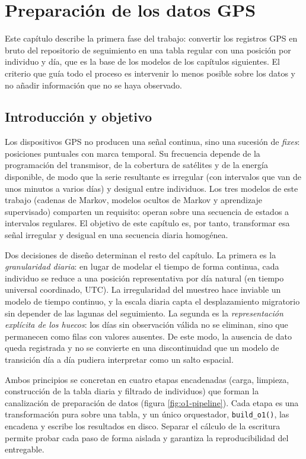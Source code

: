 \chapter{Preparación de los datos GPS}
\label{ch:o1}

Este capítulo describe la primera fase del trabajo: convertir los registros GPS
en bruto del repositorio de seguimiento en una tabla regular con una posición por
individuo y día, que es la base de los modelos de los capítulos siguientes. El
criterio que guía todo el proceso es intervenir lo menos posible sobre los datos
y no añadir información que no se haya observado.

\section{Introducción y objetivo}
\label{sec:o1-intro}

Los dispositivos GPS no producen una señal continua, sino una sucesión de
\textit{fixes}: posiciones puntuales con marca temporal. Su frecuencia depende de
la programación del transmisor, de la cobertura de satélites y de la energía
disponible, de modo que la serie resultante es irregular (con intervalos que van
de unos minutos a varios días) y desigual entre individuos. Los tres modelos de
este trabajo (cadenas de Markov, modelos ocultos de Markov y aprendizaje
supervisado) comparten un requisito: operan sobre una secuencia de estados a
intervalos regulares. El objetivo de este capítulo es, por tanto, transformar esa
señal irregular y desigual en una secuencia diaria homogénea.

Dos decisiones de diseño determinan el resto del capítulo. La primera es la
\emph{granularidad diaria}: en lugar de modelar el tiempo de forma continua, cada
individuo se reduce a una posición representativa por día natural (en tiempo
universal coordinado, UTC). La irregularidad del muestreo hace inviable un modelo
de tiempo continuo, y la escala diaria capta el desplazamiento migratorio sin
depender de las lagunas del seguimiento. La segunda es la \emph{representación
explícita de los huecos}: los días sin observación válida no se eliminan, sino que
permanecen como filas con valores ausentes. De este modo, la ausencia de dato
queda registrada y no se convierte en una discontinuidad que un modelo de
transición día a día pudiera interpretar como un salto espacial.

Ambos principios se concretan en cuatro etapas encadenadas (carga, limpieza,
construcción de la tabla diaria y filtrado de individuos) que forman la
canalización de preparación de datos (figura \ref{fig:o1-pipeline}). Cada etapa es
una transformación pura sobre una tabla, y un único orquestador,
\texttt{build\_o1()}, las encadena y escribe los resultados en disco. Separar el
cálculo de la escritura permite probar cada paso de forma aislada y garantiza la
reproducibilidad del entregable.

